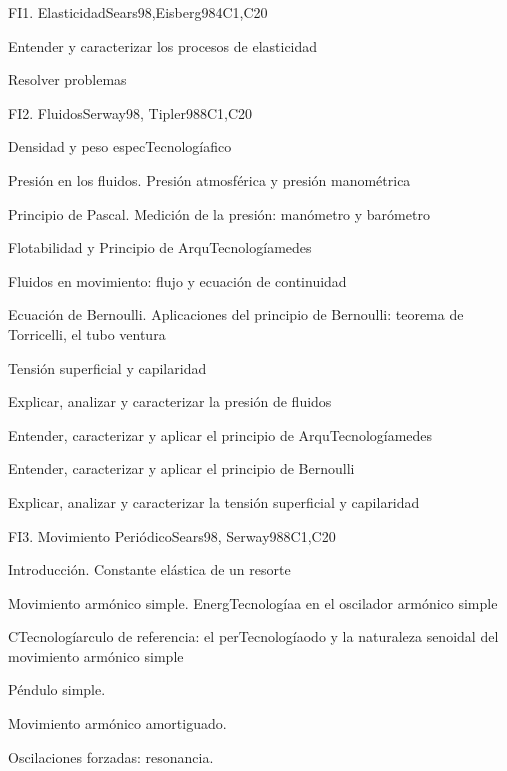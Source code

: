 \begin{syllabus}
\begin{unit}{FI1. Elasticidad}{}{Sears98,Eisberg98}{4}{C1,C20}
   \begin{learningoutcomes}
         \item  Entender y caracterizar los procesos de elasticidad
         \item  Resolver problemas
   \end{learningoutcomes}
\end{unit}

\begin{unit}{FI2. Fluidos}{Serway98, Tipler98}{}{8}{C1,C20}
\begin{topics}
         \item  Densidad y peso especTecnologíafico
	 \item  Presión en los fluidos. Presión atmosférica y presión manométrica
         \item  Principio de Pascal. Medición de la presión: manómetro y barómetro
	 \item  Flotabilidad y Principio de ArquTecnologíamedes
         \item  Fluidos en movimiento: flujo y ecuación de continuidad
	 \item  Ecuación de Bernoulli. Aplicaciones del principio de Bernoulli: teorema de Torricelli, el tubo ventura
         \item  Tensión superficial y capilaridad
   \end{topics}

   \begin{learningoutcomes}
         \item  Explicar, analizar y caracterizar la presión de fluidos
         \item  Entender, caracterizar y aplicar el principio de ArquTecnologíamedes
         \item  Entender, caracterizar y aplicar el principio de Bernoulli
         \item  Explicar, analizar y caracterizar la tensión superficial y capilaridad
   \end{learningoutcomes}
\end{unit}

\begin{unit}{FI3. Movimiento Periódico}{Sears98, Serway98}{}{8}{C1,C20}
\begin{topics}
         \item  Introducción. Constante elástica de un resorte
	 \item  Movimiento armónico simple. EnergTecnologíaa en el oscilador armónico simple
         \item  CTecnologíarculo de referencia: el perTecnologíaodo y la naturaleza senoidal del movimiento armónico simple
	 \item  Péndulo simple.
         \item  Movimiento armónico amortiguado.
         \item  Oscilaciones forzadas: resonancia.
   \end{topics}


\end{unit}
\end{syllabus}
